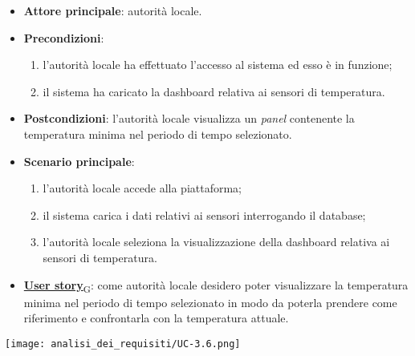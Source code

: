 \begin{itemize}
	\item \textbf{Attore principale}: autorità locale.
	\item \textbf{Precondizioni}:
	      \begin{enumerate}
		      \item l'autorità locale ha effettuato l'accesso al sistema ed esso è in funzione;
		      \item il sistema ha caricato la dashboard relativa ai sensori di temperatura.
	      \end{enumerate}
	\item \textbf{Postcondizioni}: l'autorità locale visualizza un \textit{panel} contenente la temperatura minima nel periodo di tempo selezionato.
	\item \textbf{Scenario principale}:
	      \begin{enumerate}
		      \item l'autorità locale accede alla piattaforma;
		      \item il sistema carica i dati relativi ai sensori interrogando il database;
		      \item l'autorità locale seleziona la visualizzazione della dashboard relativa ai sensori di temperatura.
	      \end{enumerate}
	\item \href{https://7last.github.io/docs/rtb/documentazione-interna/glossario\#user-story}{\textbf{User story}\textsubscript{G}}:
	      come autorità locale desidero poter visualizzare la temperatura minima nel periodo di tempo selezionato
	      in modo da poterla prendere come riferimento e confrontarla con la temperatura attuale.
\end{itemize}
\begin{center}
	\texttt{[image: analisi\_dei\_requisiti/UC-3.6.png]}
\end{center}

